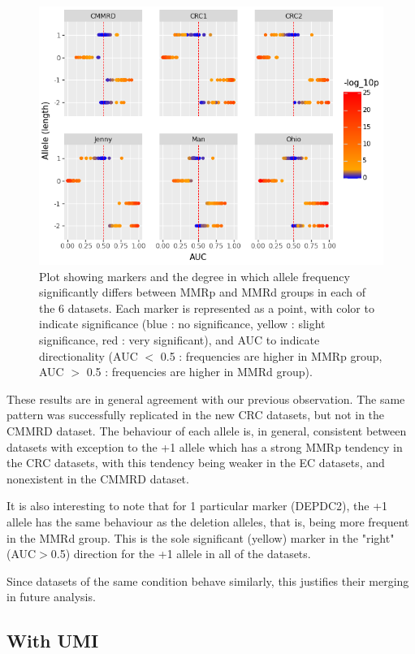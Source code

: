 \documentclass[fleqn,10pt]{olplainarticle}
\begin{document}
\begin{figure}[h]
\includegraphics[scale=1]{"Figure1.png"}
\caption{Plot showing markers and the degree in which allele frequency significantly differs between MMRp and MMRd groups in each of the 6 datasets. Each marker is represented as a point, with color to indicate significance (blue : no significance, yellow : slight significance, red : very significant), and AUC to indicate directionality (AUC $<$ 0.5 : frequencies are higher in MMRp group, AUC $>$ 0.5 : frequencies are higher in MMRd group).}
\end{figure}

These results are in general agreement with our previous observation. The same pattern was successfully replicated in the new CRC datasets, but not in the CMMRD dataset. The behaviour of each allele is, in general, consistent between datasets with exception to the +1 allele which has a strong MMRp tendency in the CRC datasets, with this tendency being weaker in the EC datasets, and nonexistent in the CMMRD dataset. 

It is also interesting to note that for 1 particular marker (DEPDC2), the +1 allele has the same behaviour as the deletion alleles, that is, being more frequent in the MMRd group. This is the sole significant (yellow) marker in the "right" (AUC$>$0.5) direction for the +1 allele in all of the datasets.

Since datasets of the same condition behave similarly, this justifies their merging in future analysis.

\newpage


\subsection{With UMI}
\end{document}
